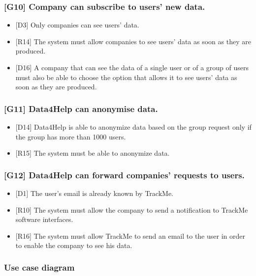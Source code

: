 \documentclass{article}
\begin{document}
\subsubsection{[G10] Company can subscribe to users’ new data.}
\begin{itemize}
\item {[D3]} Only companies can see users’ data.
\item {[R14]} The system must allow companies to see users' data as soon as they are produced.
\item {[D16]} A company that can see the data of a single user or of a group of users must also be able to choose the option that allows it to see users' data as soon as they are produced.
\end{itemize}
\subsubsection{[G11] Data4Help can anonymise data.}
\begin{itemize}
\item {[D14]} Data4Help is able to anonymize data based on the group request only if the group has more than 1000 users.
\item {[R15]} The system must be able to anonymize data.
\end{itemize}
\subsubsection{[G12] Data4Help can forward companies’ requests to users.}
\begin{itemize}
\item {[D1]} The user’s email is already known by TrackMe.
\item {[R10]} The system must allow the company to send a notification to TrackMe software interfaces.
\item {[R16]} The system must allow TrackMe to send an email to the user in order to enable the company to see his data.
\end{itemize}\newpage
\subsubsection{Use case diagram}
\end{document}
